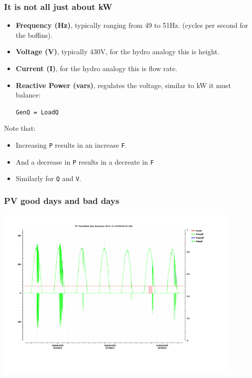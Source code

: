 \documentclass{beamer}
\begin{document}
\begin{frame}\frametitle{It is not all just about kW}
  \begin{itemize}
  \item \textbf{Frequency (Hz)}, typically ranging from 49 to 51Hz.
    (cycles per second for the boffins).
  \item \textbf{Voltage (V)}, typically 430V, for the hydro analogy
    this is height.
  \item \textbf{Current (I)}, for the hydro analogy this is flow rate.
    \pause
  \item \textbf{Reactive Power (vars)}, regulates the voltage, similar
    to kW it must balance:
    
    \texttt{GenQ = LoadQ}
  \end{itemize}
  Note that:
  \begin{itemize}
  \item Increasing \texttt{P} results in an increase \texttt{F}.
  \item And a decrease in \texttt{P} results in a decreate in
    \texttt{F}
  \item Similarly for \texttt{Q} and \texttt{V}.
  \end{itemize}
\end{frame}

\begin{frame}\frametitle{PV good days and bad days}
  \includegraphics[width=12cm]{stuff/gday.pdf}
\end{frame}
\end{document}
